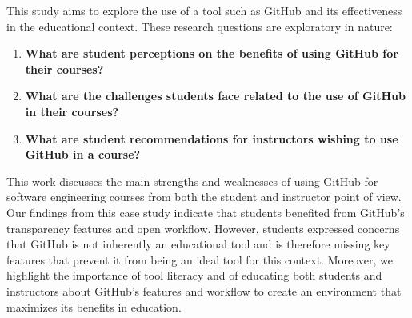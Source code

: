 
This study aims to explore the use of a tool such as GitHub and its effectiveness in the educational context. These research questions are exploratory in nature:
\begin{enumerate}
\item \textbf{What are student perceptions on the benefits of using GitHub for their courses?}
\item \textbf{What are the challenges students face related to the use of GitHub in their courses?}
\item \textbf{What are student recommendations for instructors wishing to use GitHub in a course?}
\end{enumerate}

This work discusses the main strengths and weaknesses of using GitHub for software engineering courses from both the student and instructor point of view. Our findings from this case study indicate that students benefited from GitHub's transparency features and open workflow. However, students expressed concerns that GitHub is not inherently an educational tool and is therefore missing key features that prevent it from being an ideal tool for this context. Moreover, we highlight the importance of tool literacy and of educating both students and instructors about GitHub's features and workflow to create an environment that maximizes its benefits in education.



